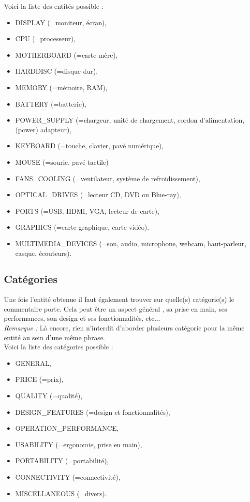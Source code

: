 \documentclass[12pt ,a4paper ]{article}
\begin{document}
\begin{multicols}{2}
\noindent Voici la liste des entités possible : 
\begin{itemize}
\item DISPLAY (=moniteur, écran), 
\item CPU (=processeur), 
\item MOTHERBOARD (=carte mère),
\item HARDDISC (=disque dur), 
\item MEMORY (=mémoire, RAM), 
\item BATTERY (=batterie), 
\item POWER\_SUPPLY (=chargeur, unité de chargement, cordon d'alimentation, (power) adapteur),
\item KEYBOARD (=touche, clavier, pavé numérique), 
\item MOUSE (=sourie, pavé tactile)
\item FANS\_COOLING (=ventilateur, système de refroidissement), 
\item OPTICAL\_DRIVES (=lecteur CD, DVD ou Blue-ray),
\item PORTS (=USB, HDMI, VGA, lecteur de carte),
\item GRAPHICS (=carte graphique, carte vidéo),
\item MULTIMEDIA\_DEVICES (=son, audio, microphone, webcam, haut-parleur, casque, écouteurs).
\end{itemize}				

\subsection{Catégories}
\noindent Une fois l'entité obtenue il faut également trouver sur quelle(s) catégorie(s) le commentaire porte. Cela peut être un aspect général , sa prise en main, ses performances, son design et ses fonctionnalités, etc... \\

\noindent\textit{Remarque : }Là encore, rien n'interdit d'aborder plusieurs catégorie pour la même entité au sein d'une même phrase.\\

\noindent Voici la liste des catégories possible : 
\begin{itemize}
\item GENERAL, 
\item PRICE (=prix), 
\item QUALITY (=qualité), 
\item DESIGN\_FEATURES (=design et fonctionnalités),
\item OPERATION\_PERFORMANCE, 
\item USABILITY (=ergonomie, prise en main), 
\item PORTABILITY (=portabilité),
\item CONNECTIVITY (=connectivité), 
\item MISCELLANEOUS (=divers).
\end{itemize}	


\end{multicols}
\end{document}
